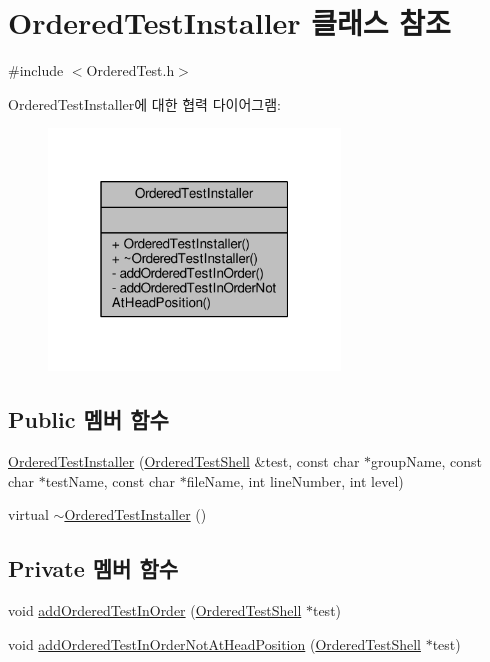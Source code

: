 \hypertarget{class_ordered_test_installer}{}\section{Ordered\+Test\+Installer 클래스 참조}
\label{class_ordered_test_installer}


{\ttfamily \#include $<$Ordered\+Test.\+h$>$}



Ordered\+Test\+Installer에 대한 협력 다이어그램\+:
\nopagebreak
\begin{figure}[H]
\begin{center}
\leavevmode
\includegraphics[width=220pt]{class_ordered_test_installer__coll__graph}
\end{center}
\end{figure}
\subsection*{Public 멤버 함수}
\begin{DoxyCompactItemize}
\item 
\hyperlink{class_ordered_test_installer_a810d542952569b67e0b3956c361aee58}{Ordered\+Test\+Installer} (\hyperlink{class_ordered_test_shell}{Ordered\+Test\+Shell} \&test, const char $\ast$group\+Name, const char $\ast$test\+Name, const char $\ast$file\+Name, int line\+Number, int level)
\item 
virtual \hyperlink{class_ordered_test_installer_a2dce2541e2bfe615a809ff67e2ce73c3}{$\sim$\+Ordered\+Test\+Installer} ()
\end{DoxyCompactItemize}
\subsection*{Private 멤버 함수}
\begin{DoxyCompactItemize}
\item 
void \hyperlink{class_ordered_test_installer_a540a39671d7fc6c51fb463c2695dad15}{add\+Ordered\+Test\+In\+Order} (\hyperlink{class_ordered_test_shell}{Ordered\+Test\+Shell} $\ast$test)
\item 
void \hyperlink{class_ordered_test_installer_a06dca4e5ace29ea63dbf99fabfee1212}{add\+Ordered\+Test\+In\+Order\+Not\+At\+Head\+Position} (\hyperlink{class_ordered_test_shell}{Ordered\+Test\+Shell} $\ast$test)
\end{DoxyCompactItemize}


